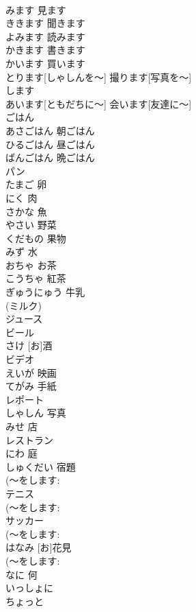 \documentclass[8pt]{extreport}
\begin{document}
\begin{CJK}{UTF8}{min}
\\	みます	見ます	
\\	ききます	聞きます	
\\	よみます	読みます	
\\	かきます	書きます	
\\	かいます	買います	
\\	とります[しゃしんを～]	撮ります[写真を～]	
\\	します			
\\	あいます[ともだちに～]	会います[友達に～]	
\\	ごはん			
\\	あさごはん	朝ごはん	
\\	ひるごはん	昼ごはん	
\\	ばんごはん	晩ごはん	
\\	パン			
\\	たまご	卵	
\\	にく	肉	
\\	さかな	魚	
\\	やさい	野菜	
\\	くだもの	果物	
\\	みず	水	
\\	おちゃ	お茶	
\\	こうちゃ	紅茶	
\\	ぎゅうにゅう	牛乳	
\\	(ミルク)					
\\	ジュース			
\\	ビール			
\\	[お]さけ	[お]酒	
\\	ビデオ			
\\	えいが	映画	
\\	てがみ	手紙	
\\	レポート			
\\	しゃしん	写真	
\\	みせ	店	
\\	レストラン			
\\	にわ	庭	
\\	しゅくだい	宿題	
\\	(～をします: 
\\	テニス			
\\	(～をします: 
\\	サッカー			
\\	(～をします: 
\\	[お]はなみ	[お]花見	
\\	(～をします: 
\\	なに	何	
\\	いっしょに			
\\	ちょっと			

\end{CJK}
\end{document}
